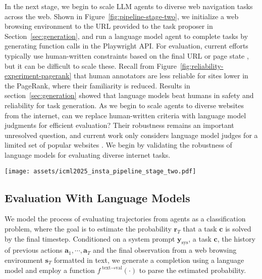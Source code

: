 In the next stage, we begin to scale LLM agents to diverse web navigation tasks across the web. Shown in Figure~\ref{fig:pipeline-stage-two}, we initialize a web browsing environment to the URL provided to the task proposer in Section~\ref{sec:generation}, and run a language model agent to complete tasks by generating function calls in the Playwright API. For evaluation, current efforts typically use human-written constraints based on the final URL or page state \citep{WebArena,VisualWebArena,WebShop,WorkArena}, but it can be difficult to scale these. Recall from Figure~\ref{fig:reliability-experiment-pagerank} that human annotators are less reliable for sites lower in the PageRank, where their familiarity is reduced. Results in section~\ref{sec:generation} showed that language models beat humans in safety and reliability for task generation. As we begin to scale agents to diverse websites from the internet, can we replace human-written criteria with language model judgments for efficient evaluation? Their robustness remains an important unresolved question, and current work only considers language model judges for a limited set of popular websites \citep{WebVoyager}.
We begin by validating the robustness of language models for evaluating diverse internet tasks.

\begin{figure*}
    \centering
    \texttt{[image: assets/icml2025\_insta\_pipeline\_stage\_two.pdf]}
    \vspace{-0.3cm}
    \caption{\small \textbf{Automatic evaluation for agents with language model judges.} Building on the large and diverse set of tasks generated by the pipeline, we employ pretrained language models to attempt and evaluate web navigation tasks. We dispatch language model agents to perform tasks by making calls to the Playwright API. We then employ language model judges to evaluate the trajectories.}
    \vspace{-0.3cm}
    \label{fig:pipeline-stage-two}
\end{figure*}

\subsection{Evaluation With Language Models}
\label{sec:robust-evaluation}

We model the process of evaluating trajectories from agents as a classification problem, where the goal is to estimate the probability $\mathbf{r}_{T}$ that a task $\mathbf{c}$ is solved by the final timestep. Conditioned on a system prompt $\mathbf{y}_{\text{sys}}$, a task $\mathbf{c}$, the history of previous actions $\mathbf{a}_{1}, \cdots, \mathbf{a}_{T}$ and the final observation from a web browsing environment $\mathbf{s}_{T}$ formatted in text, we generate a completion using a language model and employ a function $f^{\;\text{text} \to \text{val}} (\cdot)$ to parse the estimated probability.

